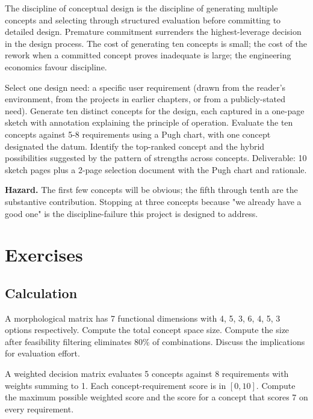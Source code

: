\begin{principle}
The discipline of conceptual design is the discipline of generating multiple concepts and selecting through structured evaluation before committing to detailed design. Premature commitment surrenders the highest-leverage decision in the design process. The cost of generating ten concepts is small; the cost of the rework when a committed concept proves inadequate is large; the engineering economics favour discipline.
\end{principle}

\begin{project}
Select one design need: a specific user requirement (drawn from the reader's environment, from the projects in earlier chapters, or from a publicly-stated need). Generate ten distinct concepts for the design, each captured in a one-page sketch with annotation explaining the principle of operation. Evaluate the ten concepts against 5-8 requirements using a Pugh chart, with one concept designated the datum. Identify the top-ranked concept and the hybrid possibilities suggested by the pattern of strengths across concepts. Deliverable: 10 sketch pages plus a 2-page selection document with the Pugh chart and rationale.

\textbf{Hazard.} The first few concepts will be obvious; the fifth through tenth are the substantive contribution. Stopping at three concepts because "we already have a good one" is the discipline-failure this project is designed to address.
\end{project}

\section{Exercises}

\subsection*{Calculation}

\begin{exercise}
A morphological matrix has 7 functional dimensions with 4, 5, 3, 6, 4, 5, 3 options respectively. Compute the total concept space size. Compute the size after feasibility filtering eliminates 80\% of combinations. Discuss the implications for evaluation effort.
\end{exercise}

\begin{exercise}
A weighted decision matrix evaluates 5 concepts against 8 requirements with weights summing to 1. Each concept-requirement score is in $[0, 10]$. Compute the maximum possible weighted score and the score for a concept that scores 7 on every requirement.
\end{exercise}


